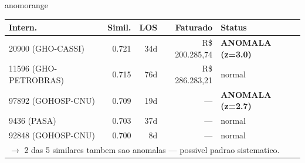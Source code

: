 \documentclass[a4paper,10pt]{article}
\begin{document}
\begin{anomalycard}[Internacao 161907 | GHO-PETROBRAS | ALTO (z=4.70)]{anomorange}
\begin{tabular}{l r r r l}\toprule\textbf{Intern.} & \textbf{Simil.} & \textbf{LOS} & \textbf{Faturado} & \textbf{Status} \\\midrule
20900 (GHO-CASSI) & 0.721 & 34d & R\$ 200.285,74 & \textcolor{anomred}{\textbf{ANOMALA (z=3.0)}} \\
11596 (GHO-PETROBRAS) & 0.715 & 76d & R\$ 286.283,21 & \textcolor{jcubeblue}{normal} \\
97892 (GOHOSP-CNU) & 0.709 & 19d & --- & \textcolor{anomred}{\textbf{ANOMALA (z=2.7)}} \\
9436 (PASA) & 0.703 & 37d & --- & \textcolor{jcubeblue}{normal} \\
92848 (GOHOSP-CNU) & 0.700 & 8d & --- & \textcolor{jcubeblue}{normal} \\
\multicolumn{5}{l}{\textcolor{anomred}{\small $\rightarrow$ 2 das 5 similares tambem sao anomalas --- possivel padrao sistematico.}} \\
\bottomrule\end{tabular}



\end{anomalycard}

\newpage
\end{document}
